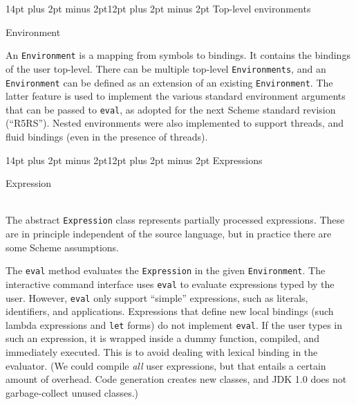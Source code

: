\documentclass[twocolumn]{article}
\makeatletter
\def\section{\@startsection {section}{1}{\z@}
   {14pt plus 2pt minus 2pt}{12pt plus 2pt minus 2pt} {\large\bf}}
\makeatother
\begin{document}
\section{Top-level environments}

\begin{Class}{Environment}{}
\end{Class}

An {\tt Environment} is a mapping from symbols to bindings.
It contains the bindings of the user top-level.
There can be multiple top-level {\tt Environments}, and
an {\tt Environment} can be defined as an extension 
of an existing {\tt Environment}.
The latter feature is used to implement the various standard
environment arguments that can be passed to {\tt eval},
as adopted for the next Scheme standard revision (``R5RS'').
Nested environments were also implemented to support threads,
and fluid bindings (even in the presence of threads).

\section{Expressions}

\begin{Class}{Expression}{}
\\
\\
\end{Class}

The abstract {\tt Expression} class represents partially processed expressions.
These are in principle independent of the source language,
but in practice there are some Scheme assumptions.

The {\tt eval} method evaluates the {\tt Expression} in the
given {\tt Environment}.  The interactive command interface uses
{\tt eval} to evaluate expressions typed by the user.  However,
{\tt eval} only support ``simple'' expressions, such as literals,
identifiers, and applications.  Expressions that define new
local bindings (such lambda expressions and {\tt let} forms)
do not implement {\tt eval}.  If the user types in such an
expression, it is wrapped inside a dummy function,
compiled, and immediately executed.  This is to avoid dealing
with lexical binding in the evaluator.  (We could compile
\emph{all} user expressions, but that entails a certain amount of
overhead.  Code generation creates new classes, and JDK 1.0 does
not garbage-collect unused classes.)
\end{document}
